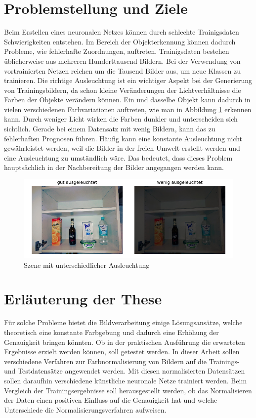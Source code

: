 \section{Problemstellung und Ziele}\label{s.probuziel} 
Beim Erstellen eines neuronalen Netzes können durch schlechte Trainigsdaten Schwierigkeiten entstehen. Im Bereich der Objekterkennung können dadurch Probleme, wie fehlerhafte Zuordnungen, auftreten. Trainigsdaten bestehen üblicherweise aus mehreren Hunderttausend Bildern. Bei der Verwendung von vortrainierten Netzen reichen um die Tausend Bilder aus, um neue Klassen zu trainieren. Die richtige Ausleuchtung ist ein wichtiger Aspekt bei der Generierung von Trainingsbildern, da schon kleine Veränderungen der Lichtverhältnisse die Farben der Objekte verändern können. Ein und dasselbe Objekt kann dadurch in vielen verschiedenen Farbvariationen auftreten, wie man in Abbildung \ref{img:problem} erkennen kann. Durch weniger Licht wirken die Farben dunkler und unterscheiden sich sichtlich. Gerade bei einem Datensatz mit wenig Bildern, kann das zu fehlerhaften Prognosen führen. Häufig kann eine konstante Ausleuchtung nicht gewährleistet werden, weil die Bilder in der freien Umwelt erstellt werden und eine Ausleuchtung zu umständlich wäre. Das bedeutet, dass dieses Problem hauptsächlich in der Nachbereitung der Bilder angegangen werden kann.
\begin{figure}
	[h]
	\centering
	\includegraphics[scale=0.7]{Sources/Vergleich.png}
	\caption{Szene mit unterschiedlicher Ausleuchtung}
	\label{img:problem}
\end{figure}
\section{Erläuterung der These}\label{s.these}
Für solche Probleme bietet die Bildverarbeitung einige Lösungsansätze, welche theoretisch eine konstante Farbgebung und dadurch eine Erhöhung der Genauigkeit bringen könnten. Ob in der praktischen Ausführung die erwarteten Ergebnisse erzielt werden können, soll getestet werden. In dieser Arbeit sollen verschiedene Verfahren zur Farbnormalisierung von Bildern auf die Trainings- und Testdatensätze angewendet werden. Mit diesen normalisierten Datensätzen sollen daraufhin verschiedene künstliche neuronale Netze trainiert werden. Beim Vergleich der Trainingsergebnisse soll herausgestellt werden, ob das Normalisieren der Daten einen positiven Einfluss auf die Genauigkeit hat und welche Unterschiede die Normalisierungsverfahren aufweisen.
